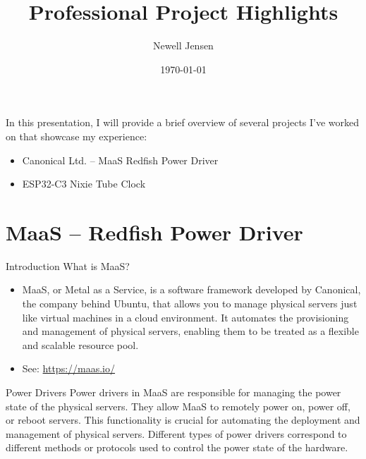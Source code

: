 \documentclass{beamer}
\title{Professional Project Highlights}
\date{\today}
\author{Newell Jensen}
\begin{document}
    \maketitle

    \begin{frame}
        In this presentation, I will provide a brief overview of several projects I've worked on that showcase my experience:
        \begin{itemize}
            \item Canonical Ltd. -- MaaS Redfish Power Driver
            \item ESP32-C3 Nixie Tube Clock
        \end{itemize}
    \end{frame}

    \section{MaaS -- Redfish Power Driver}
    \begin{frame}{Introduction}
        What is MaaS?

        \begin{itemize}
            \item MaaS, or Metal as a Service, is a software framework developed by Canonical, the company behind Ubuntu, that allows you to manage physical servers just like virtual machines in a cloud environment. It automates the provisioning and management of physical servers, enabling them to be treated as a flexible and scalable resource pool.
            \item See: \href{https://maas.io/}{https://maas.io/}
        \end{itemize}


    \end{frame}

    \begin{frame}{Power Drivers}
        Power drivers in MaaS are responsible for managing the power state of the physical servers. They allow MaaS to remotely power on, power off, or reboot servers. This functionality is crucial for automating the deployment and management of physical servers. Different types of power drivers correspond to different methods or protocols used to control the power state of the hardware.
    \end{frame}
\end{document}
